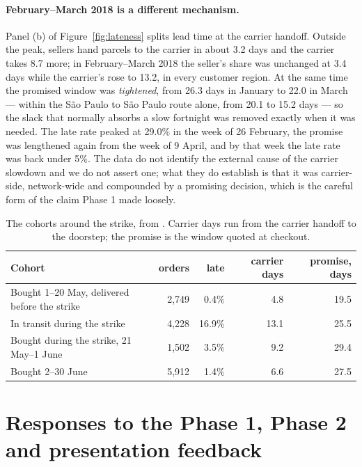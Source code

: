 \paragraph{February--March 2018 is a different mechanism.} Panel (b) of
Figure~\ref{fig:lateness} splits lead time at the carrier handoff. Outside the
peak, sellers hand parcels to the carrier in about 3.2 days and the carrier
takes 8.7 more; in February--March 2018 the seller's share was unchanged at
3.4 days while the carrier's rose to 13.2, in every customer region. At the
same time the promised window was \emph{tightened}, from 26.3 days in January
to 22.0 in March --- within the S\~{a}o Paulo to S\~{a}o Paulo route alone, from
20.1 to 15.2 days --- so the slack that normally absorbs a slow fortnight was
removed exactly when it was needed. The late rate peaked at 29.0\% in the week
of 26 February, the promise was lengthened again from the week of 9 April, and
by that week the late rate was back under 5\%. The data do not identify the
external cause of the carrier slowdown and we do not assert one; what they do
establish is that it was carrier-side, network-wide and compounded by a
promising decision, which is the careful form of the claim Phase 1 made loosely.

\begin{table}[htbp]
\centering
\caption{The cohorts around the strike, from
. Carrier days run from the carrier
handoff to the doorstep; the promise is the window quoted at checkout.}
\label{tab:strike}
\footnotesize
\begin{tabular}{@{}lrrrr@{}}
\toprule
\textbf{Cohort} & \textbf{orders} & \textbf{late} & \textbf{carrier days} & \textbf{promise, days} \\
\midrule
Bought 1--20 May, delivered before the strike & 2{,}749 & 0.4\%  & 4.8  & 19.5 \\
In transit during the strike                  & 4{,}228 & 16.9\% & 13.1 & 25.5 \\
Bought during the strike, 21 May--1 June      & 1{,}502 & 3.5\%  & 9.2  & 29.4 \\
Bought 2--30 June                             & 5{,}912 & 1.4\%  & 6.6  & 27.5 \\
\bottomrule
\end{tabular}
\end{table}

\clearpage
\section{Responses to the Phase 1, Phase 2 and presentation feedback}
\label{app:feedback}

